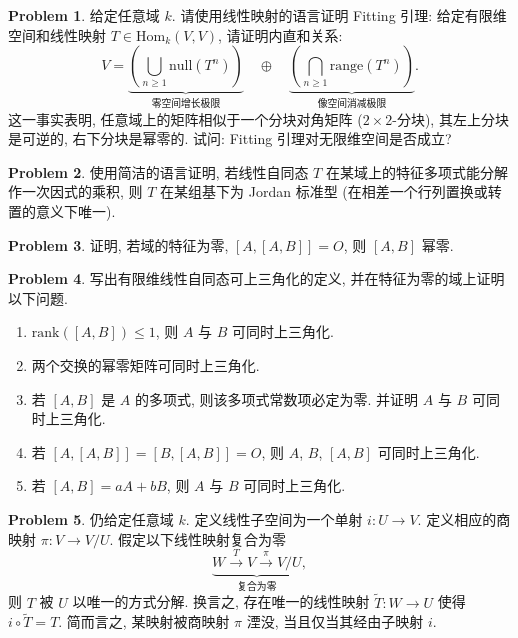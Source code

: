 \documentclass{MainStyle}
\theoremstyle{definition}
\newtheorem{problem}{Problem}
\begin{document}
\begin{problem}
给定任意域 $k$. 请使用线性映射的语言证明 Fitting 引理: 给定有限维空间和线性映射 $T\in \mathrm{Hom}_k(V,V)$, 请证明内直和关系:
\begin{equation}
    V=\underset{\text{零空间增长极限}}{\underbrace{\left(\bigcup_{n\geq 1}\mathrm{null}(T^n)\right)}}\quad \oplus \quad \underset{\text{像空间消减极限}}{\underbrace{\left(\bigcap_{n\geq 1}\mathrm{range}(T^n)\right)}}.
\end{equation}
这一事实表明, 任意域上的矩阵相似于一个分块对角矩阵 ($2\times 2$-分块), 其左上分块是可逆的, 右下分块是幂零的. 试问: Fitting 引理对无限维空间是否成立?
\end{problem}

\begin{problem}
使用简洁的语言证明, 若线性自同态 $T$ 在某域上的特征多项式能分解作一次因式的乘积, 则 $T$ 在某组基下为 Jordan 标准型 (在相差一个行列置换或转置的意义下唯一).
\end{problem}

\begin{problem}
证明, 若域的特征为零, $[A,[A,B]]=O$, 则 $[A,B]$ 幂零.
\end{problem}

\begin{problem}
写出有限维线性自同态可上三角化的定义, 并在特征为零的域上证明以下问题.
\begin{enumerate}
    \item $\mathrm{rank}([A,B])\leq 1$, 则 $A$ 与 $B$ 可同时上三角化.
    \item 两个交换的幂零矩阵可同时上三角化.
    \item 若 $[A,B]$ 是 $A$ 的多项式, 则该多项式常数项必定为零. 并证明 $A$ 与 $B$ 可同时上三角化.
    \item 若 $[A,[A,B]]=[B,[A,B]]=O$, 则 $A$, $B$, $[A,B]$ 可同时上三角化.
    \item 若 $[A,B]=aA+bB$, 则 $A$ 与 $B$ 可同时上三角化.
\end{enumerate}
\end{problem}

\begin{problem}
仍给定任意域 $k$. 定义线性子空间为一个单射 $i:U\to V$. 定义相应的商映射 $\pi:V\to V/U$. 假定以下线性映射复合为零
\begin{equation}
    \underset{\text{复合为零}}{\underbrace{W\overset T\longrightarrow V\overset \pi\longrightarrow V/U}},
\end{equation}
则 $T$ 被 $U$ 以唯一的方式分解. 换言之, 存在唯一的线性映射 $\widetilde T:W\to U$ 使得 $i\circ \widetilde T=T$. 简而言之, 某映射被商映射 $\pi$ 湮没, 当且仅当其经由子映射 $i$.
\end{problem}
\end{document}
